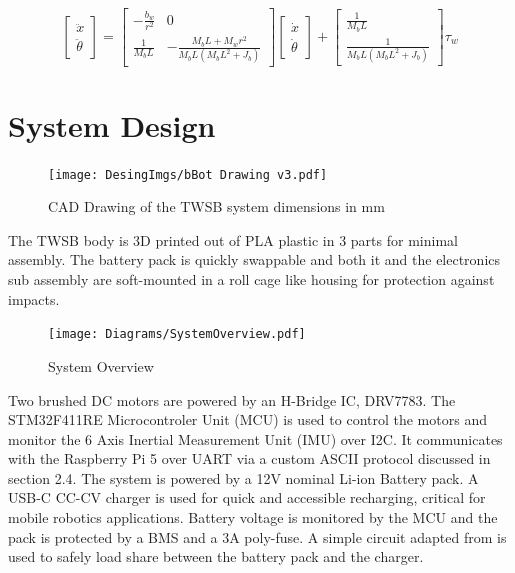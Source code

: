     \begin{equation}
        \begin{bmatrix}
            \ddot{x} \\
            \ddot{\theta}
        \end{bmatrix}
        =
        \begin{bmatrix}
            -\frac{b_w}{r^2} & 0 \\
            \frac{1}{M_b L} & -\frac{M_b L + M_w r^2}{M_b L (M_b L^2 + J_b)}
        \end{bmatrix}
        \begin{bmatrix}
            \dot{x} \\
            \dot{\theta}
        \end{bmatrix}
        +
        \begin{bmatrix}
            \frac{1}{M_b L} \\
            \frac{1}{M_b L (M_b L^2 + J_b)}
        \end{bmatrix}
        \tau_w
        \label{eq:2DOF}
    \end{equation}


   

    
    \pagebreak{}


    \section{System Design}
        \begin{figure}[H]
            \texttt{[image: DesingImgs/bBot Drawing v3.pdf]}
            \caption{CAD Drawing of the TWSB system dimensions in mm}
            \label{fig:CAD}
        \end{figure}

        The TWSB body is 3D printed out of PLA plastic in 3 parts for minimal assembly.
        The battery pack is quickly swappable and both it and the electronics sub assembly 
        are soft-mounted in a roll cage like housing for protection against impacts. 
        \begin{figure}[H]
            \centering
            \texttt{[image: Diagrams/SystemOverview.pdf]}
            \caption{System Overview}
        \end{figure}

        Two brushed DC motors are powered by an H-Bridge IC, DRV7783. 
        The STM32F411RE Microcontroler Unit (MCU) is used to control the 
        motors and monitor the 6 Axis Inertial Measurement Unit (IMU) over I2C. It communicates with the 
        Raspberry Pi 5 over UART via a custom ASCII protocol discussed in section 2.4. 
        The system is powered by a 12V nominal Li-ion Battery pack. A USB-C CC-CV charger is used for quick 
        and accessible recharging, critical for mobile robotics applications. 
        Battery voltage is monitored by the MCU and the pack is protected by a BMS and a 3A poly-fuse.
        A simple circuit adapted from \cite{chu2008designing} is used to safely load share between the battery pack and the charger.

